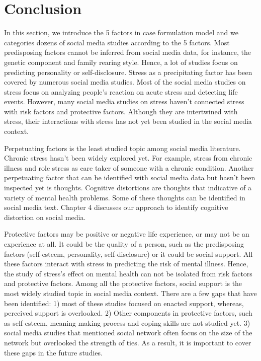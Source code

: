 \section{Conclusion}
In this section, we introduce the 5 factors in case formulation model and we categories dozens of social media studies according to the 5 factors. Most predisposing factors cannot be inferred from social media data, for instance, the genetic component and family rearing style. Hence, a lot of studies focus on predicting personality or self-disclosure. Stress as a precipitating factor has been covered by numerous social media studies. Most of the social media studies on stress focus on analyzing people's reaction on acute stress and detecting life events. However, many social media studies on stress haven't connected stress with risk factors and protective factors. Although they are intertwined with stress, their interactions with stress has not yet been studied in the social media context.

Perpetuating factors is the least studied topic among social media literature. Chronic stress hasn't been widely explored yet. For example, stress from chronic illness and role stress as care taker of someone with a chronic condition. Another perpetuating factor that can be identified with social media data but hasn't been inspected yet is thoughts. Cognitive distortions are thoughts that indicative of a variety of mental health problems. Some of these thoughts can be identified in social media text. Chapter 4 discusses our approach to identify cognitive distortion on social media.

Protective factors may be positive or negative life experience, or may not be an experience at all. It could be the quality of a person, such as the predisposing factors (self-esteem, personality, self-disclosure) or it could be social support. All these factors interact with stress in predicting the risk of mental illness. Hence, the study of stress's effect on mental health can not be isolated from risk factors and protective factors. Among all the protective factors, social support is the most widely studied topic in social media context. There are a few gaps that have been identified: 1) most of these studies focused on enacted support, whereas, perceived support is overlooked. 2) Other components in protective factors, such as self-esteem, meaning making process and coping skills are not studied yet. 3) social media studies that mentioned social network often focus on the size of the network but overlooked the strength of ties. As a result, it is important to cover these gaps in the future studies.

